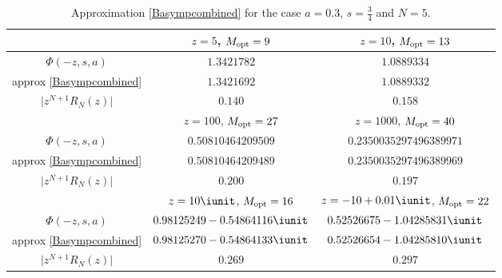 \begin{table}[ht]\renewcommand{\arraystretch}{1.2}
\begin{center}
\begin{tabular}{|c|c|c|}
\hline
 & $z=5$, $M_{\rm opt}=9$
 & $z=10$, $M_{\rm opt}=13$ \\
\hline
$\Phi(-z,s,a)$
& $1.3421782$
& $1.0889334$\\

approx \eqref{Basympcombined}
& $1.3421692$
& $1.0889332$\\

$\bigl|z^{N+1}R_N(z)\bigr|$
& $0.140$
& $0.158$\\
\hline
 & $z=100$, $M_{\rm opt}=27$
 & $z=1000$, $M_{\rm opt}=40$ \\
\hline
$\Phi(-z,s,a)$
& $0.50810464209509$
& $0.2350035297496389971$\\

approx \eqref{Basympcombined}
& $0.50810464209489$
& $0.2350035297496389969$\\

$\bigl|z^{N+1}R_N(z)\bigr|$
& $0.200$
& $0.197$\\
\hline
 & $z=10\iunit$, $M_{\rm opt}=16$
 & $z=-10+0.01\iunit$, $M_{\rm opt}=22$ \\
\hline
$\Phi(-z,s,a)$
& $0.98125249 - 0.54864116\iunit$
& $0.52526675 - 1.04285831\iunit$\\

approx \eqref{Basympcombined}
& $0.98125270 - 0.54864133\iunit$
& $0.52526654 - 1.04285810\iunit$\\

$\bigl|z^{N+1}R_N(z)\bigr|$
& $0.269$
& $0.297$\\

\hline
\end{tabular}
\caption{Approximation \eqref{Basympcombined} for the case $a=0.3$, $s=\frac34$
and $N=5$.}
\label{tab:combined}
\end{center}
\end{table}%

